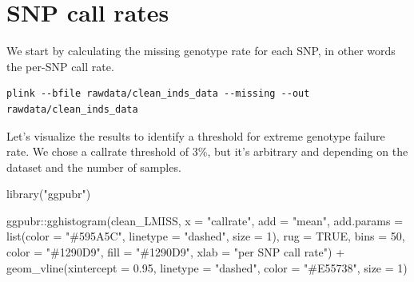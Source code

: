 \documentclass[
]{book}
\newenvironment{Shaded}{\begin{snugshade}}{\end{snugshade}}
\newcommand{\AttributeTok}[1]{\textcolor[rgb]{0.77,0.63,0.00}{#1}}
\newcommand{\CommentTok}[1]{\textcolor[rgb]{0.56,0.35,0.01}{\textit{#1}}}
\newcommand{\ConstantTok}[1]{\textcolor[rgb]{0.00,0.00,0.00}{#1}}
\newcommand{\DecValTok}[1]{\textcolor[rgb]{0.00,0.00,0.81}{#1}}
\newcommand{\FloatTok}[1]{\textcolor[rgb]{0.00,0.00,0.81}{#1}}
\newcommand{\FunctionTok}[1]{\textcolor[rgb]{0.00,0.00,0.00}{#1}}
\newcommand{\NormalTok}[1]{#1}
\newcommand{\OtherTok}[1]{\textcolor[rgb]{0.56,0.35,0.01}{#1}}
\newcommand{\SpecialCharTok}[1]{\textcolor[rgb]{0.00,0.00,0.00}{#1}}
\newcommand{\StringTok}[1]{\textcolor[rgb]{0.31,0.60,0.02}{#1}}
\begin{document}
\hypertarget{snp-call-rates}{%
\section{SNP call rates}\label{snp-call-rates}}

We start by calculating the missing genotype rate for each SNP, in other words the per-SNP call rate.

\begin{verbatim}
plink --bfile rawdata/clean_inds_data --missing --out rawdata/clean_inds_data
\end{verbatim}

Let's visualize the results to identify a threshold for extreme genotype failure rate. We chose a callrate threshold of 3\%, but it's arbitrary and depending on the dataset and the number of samples.

\begin{Shaded}
\end{Shaded}

\begin{Shaded}
\begin{Highlighting}[]
\FunctionTok{library}\NormalTok{(}\StringTok{"ggpubr"}\NormalTok{)}

\NormalTok{ggpubr}\SpecialCharTok{::}\FunctionTok{gghistogram}\NormalTok{(clean\_LMISS, }\AttributeTok{x =} \StringTok{"callrate"}\NormalTok{,}
                    \AttributeTok{add =} \StringTok{"mean"}\NormalTok{, }\AttributeTok{add.params =} \FunctionTok{list}\NormalTok{(}\AttributeTok{color =} \StringTok{"\#595A5C"}\NormalTok{, }\AttributeTok{linetype =} \StringTok{"dashed"}\NormalTok{, }\AttributeTok{size =} \DecValTok{1}\NormalTok{),}
                    \AttributeTok{rug =} \ConstantTok{TRUE}\NormalTok{, }\AttributeTok{bins =} \DecValTok{50}\NormalTok{,}
                    \AttributeTok{color =} \StringTok{"\#1290D9"}\NormalTok{, }\AttributeTok{fill =} \StringTok{"\#1290D9"}\NormalTok{,}
                    \AttributeTok{xlab =} \StringTok{"per SNP call rate"}\NormalTok{) }\SpecialCharTok{+}
  \FunctionTok{geom\_vline}\NormalTok{(}\AttributeTok{xintercept =} \FloatTok{0.95}\NormalTok{, }\AttributeTok{linetype =} \StringTok{"dashed"}\NormalTok{,}
                \AttributeTok{color =} \StringTok{"\#E55738"}\NormalTok{, }\AttributeTok{size =} \DecValTok{1}\NormalTok{)}
\end{Highlighting}
\end{Shaded}
\end{document}

